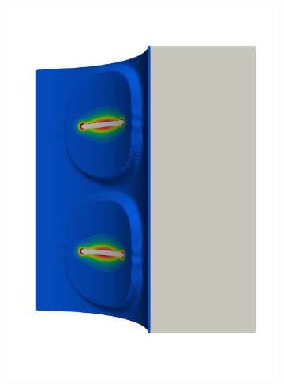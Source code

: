 \begin{frame}
\begin{columns}[T]
\begin{column}{0.6\textwidth}
\begin{figure}
{\begin{subfigure}{0.19\textwidth}
            \includegraphics[width=\textwidth]{Chapter345/figures/seed_ep_6}
          \end{subfigure}
        }
        

\end{figure}
\end{column}
\end{columns}
\end{frame}
